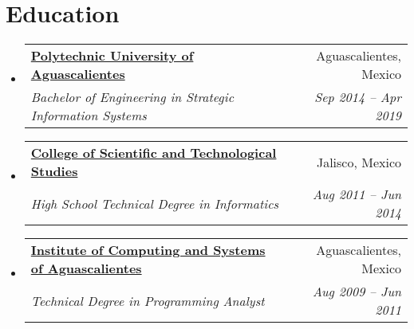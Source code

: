 \documentclass[letterpaper,11pt]{article}
\makeatletter
\newcommand{\resumeSubheading}[4]{
  \vspace{-1pt}\item
    \begin{tabular*}{0.97\textwidth}[t]{l@{\extracolsep{\fill}}r}
      \textbf{#1} & #2 \\
      \textit{\small#3} & \textit{\small #4} \\
    \end{tabular*}\vspace{-5pt}
}
\newcommand{\resumeSubHeadingListStart}{\begin{itemize}[leftmargin=*]}
\newcommand{\resumeSubHeadingListEnd}{\end{itemize}}
\makeatother
\begin{document}
\section{Education}
  \resumeSubHeadingListStart
    \resumeSubheading
      {\href{https://upa.edu.mx/}{Polytechnic University of Aguascalientes}}{Aguascalientes, Mexico}
      {Bachelor of Engineering in Strategic Information Systems}{Sep 2014 -- Apr 2019}
  \resumeSubHeadingListEnd

  \resumeSubHeadingListStart
    \resumeSubheading
      {\href{https://cecytejalisco.edu.mx/}{College of Scientific and Technological Studies}}{Jalisco, Mexico}
      {High School Technical Degree in Informatics}{Aug 2011 -- Jun 2014}
  \resumeSubHeadingListEnd

  \resumeSubHeadingListStart
    \resumeSubheading
      {\href{https://maps.app.goo.gl/BuQny3JCEST5XE4i9}{Institute of Computing and Systems of Aguascalientes}}{Aguascalientes, Mexico}
      {Technical Degree in Programming Analyst}{Aug 2009 -- Jun 2011}
  \resumeSubHeadingListEnd

\end{document}
